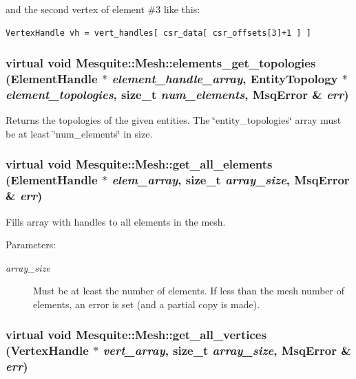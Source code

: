 \documentclass[letter]{report}
\begin{document}
and the second vertex of element \#3 like this: 

\footnotesize\begin{verbatim}VertexHandle vh = vert_handles[ csr_data[ csr_offsets[3]+1 ] ] 
\end{verbatim}\normalsize 
 

\subsubsection{\setlength{\rightskip}{0pt plus 5cm}virtual void Mesquite::Mesh::elements\_\-get\_\-topologies (Element\-Handle $\ast$ {\em element\_\-handle\_\-array}, Entity\-Topology $\ast$ {\em element\_\-topologies}, size\_\-t {\em num\_\-elements}, {\bf Msq\-Error} \& {\em err})\hspace{0.3cm}{\tt  [pure virtual]}}\label{classMesquite_1_1Mesh_a21}


Returns the topologies of the given entities. The \char`\"{}entity\_\-topologies\char`\"{} array must be at least \char`\"{}num\_\-elements\char`\"{} in size. 

\subsubsection{\setlength{\rightskip}{0pt plus 5cm}virtual void Mesquite::Mesh::get\_\-all\_\-elements (Element\-Handle $\ast$ {\em elem\_\-array}, size\_\-t {\em array\_\-size}, {\bf Msq\-Error} \& {\em err})\hspace{0.3cm}{\tt  [pure virtual]}}\label{classMesquite_1_1Mesh_a4}


Fills array with handles to all elements in the mesh.

\begin{Desc}
\item[Parameters: ]\par
\begin{description}
\item[{\em 
array\_\-size}]Must be at least the number of elements. If less than the mesh number of elements, an error is set (and a partial copy is made). \end{description}
\end{Desc}


\subsubsection{\setlength{\rightskip}{0pt plus 5cm}virtual void Mesquite::Mesh::get\_\-all\_\-vertices (Vertex\-Handle $\ast$ {\em vert\_\-array}, size\_\-t {\em array\_\-size}, {\bf Msq\-Error} \& {\em err})\hspace{0.3cm}{\tt  [pure virtual]}}\label{classMesquite_1_1Mesh_a3}
\end{document}
